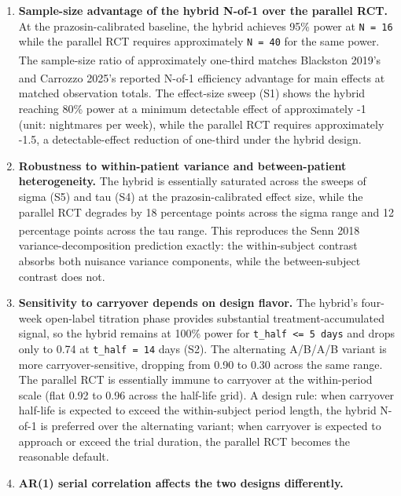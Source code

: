 \documentclass[
  11pt,
]{article}
\begin{document}
\begin{enumerate}
\def\labelenumi{\arabic{enumi}.}
\item
  \textbf{Sample-size advantage of the hybrid N-of-1 over the parallel
  RCT.} At the prazosin-calibrated baseline, the hybrid achieves 95\%
  power at \texttt{N\ =\ 16} while the parallel RCT requires
  approximately \texttt{N\ =\ 40} for the same power. The sample-size
  ratio of approximately one-third matches Blackston
  2019's\textsuperscript{}
  and Carrozzo
  2025's\textsuperscript{} reported
  N-of-1 efficiency advantage for main effects at matched observation
  totals. The effect-size sweep (S1) shows the hybrid reaching 80\%
  power at a minimum detectable effect of approximately -1 (unit:
  nightmares per week), while the parallel RCT requires approximately
  -1.5, a detectable-effect reduction of one-third under the hybrid
  design.
\item
  \textbf{Robustness to within-patient variance and between-patient
  heterogeneity.} The hybrid is essentially saturated across the sweeps
  of sigma (S5) and tau (S4) at the prazosin-calibrated effect size,
  while the parallel RCT degrades by 18 percentage points across the
  sigma range and 12 percentage points across the tau range. This
  reproduces the Senn
  2018\textsuperscript{}
  variance-decomposition prediction exactly: the within-subject contrast
  absorbs both nuisance variance components, while the between-subject
  contrast does not.
\item
  \textbf{Sensitivity to carryover depends on design flavor.} The
  hybrid's four-week open-label titration phase provides substantial
  treatment-accumulated signal, so the hybrid remains at 100\% power for
  \texttt{t\_half\ \textless{}=\ 5\ days} and drops only to 0.74 at
  \texttt{t\_half\ =\ 14} days (S2). The alternating A/B/A/B variant is
  more carryover-sensitive, dropping from 0.90 to 0.30 across the same
  range. The parallel RCT is essentially immune to carryover at the
  within-period scale (flat 0.92 to 0.96 across the half-life grid). A
  design rule: when carryover half-life is expected to exceed the
  within-subject period length, the hybrid N-of-1 is preferred over the
  alternating variant; when carryover is expected to approach or exceed
  the trial duration, the parallel RCT becomes the reasonable default.
\item
  \textbf{AR(1) serial correlation affects the two designs differently.}

\end{enumerate}
\end{document}
